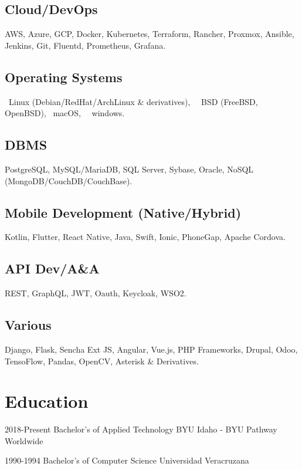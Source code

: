 \documentclass[]{friggeri-cv}
\begin{document}
\begin{multicols}{2}
    \subsection{Cloud/DevOps}
    AWS, Azure, GCP, Docker, Kubernetes, Terraform, Rancher, Proxmox, Ansible, Jenkins, Git, Fluentd, Prometheus, Grafana.
 
    \subsection{Operating Systems}
    {\faLinux}~Linux (Debian/RedHat/ArchLinux \& derivatives), {\nfBsd}~~BSD (FreeBSD, OpenBSD), {\faApple}~macOS, {\nfWindows}~~windows.

    \subsection{DBMS}
    PostgreSQL, MySQL/MariaDB, SQL Server, Sybase, Oracle, NoSQL (MongoDB/CouchDB/CouchBase).
    
    \subsection{Mobile Development (Native/Hybrid)}
    Kotlin, Flutter, React Native, Java, Swift, Ionic, PhoneGap, Apache Cordova.

    \subsection{API Dev/A\&A}
    REST, GraphQL, JWT, Oauth, Keycloak, WSO2.

    \subsection{Various}
    Django, Flask, Sencha Ext JS, Angular, Vue.js, PHP Frameworks, Drupal, Odoo, TensoFlow, Pandas, OpenCV, Asterisk \& Derivatives.

\end{multicols}

\section{Education}

\begin{entrylist}
    \entryedu%
    {2018-Present}
    {Bachelor's of Applied Technology}
    {BYU Idaho - BYU Pathway Worldwide}
\end{entrylist}

\begin{entrylist}
    \entryedu%
    {1990-1994}
    {Bachelor's of Computer Science}
    {Universidad Veracruzana}
\end{entrylist}
\end{document}
